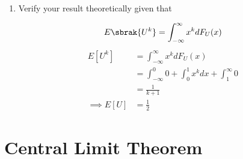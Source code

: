 \documentclass[journal,12pt,twocolumn]{IEEEtran}
\renewcommand\thesection{\arabic{section}}
\begin{document}
\begin{enumerate}[label=\thesection.\arabic*
,ref=\thesection.\theenumi]
\item Verify your result theoretically given that

\begin{equation}
E\sbrak{U^k} = \int_{-\infty}^{\infty}x^kdF_{U}(x)
\end{equation}
\solution
\begin{align}
    E[U^k] &= \int_{-\infty}^{\infty} x^k dF_U(x)\\
            &= \int_{-\infty}^{0} 0 + \int_{0}^{1}x^kdx + \int_1^{\infty}0\\
            &= \frac{1}{k+1}\\
    \implies E[U] &= \frac{1}{2}
\end{align}
%
\end{enumerate}

\section{Central Limit Theorem}
%
\end{document}
